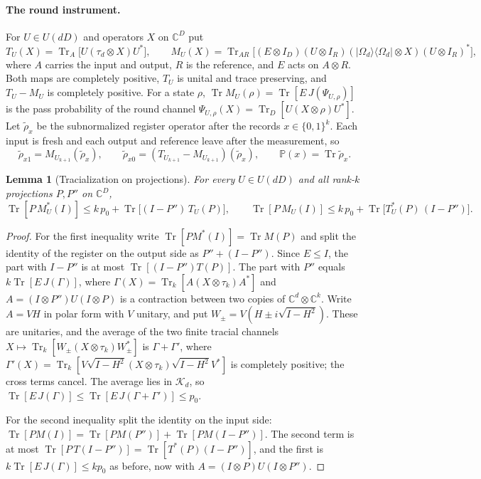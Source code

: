 \documentclass[11pt]{article}
\newtheorem{lemma}{Lemma}[section]
\theoremstyle{definition}
\theoremstyle{remark}
\DeclareMathOperator{\Tr}{Tr}
\newcommand{\K}{\mathcal K}
\newcommand{\C}{\mathbb C}
\newcommand{\Prob}{\mathbb P}
\newcommand{\ket}[1]{\lvert#1\rangle}
\newcommand{\bra}[1]{\langle#1\rvert}
\begin{document}
\paragraph{The round instrument.}
For $U\in U(dD)$ and operators $X$ on $\C^D$ put
\[
 T_U(X)=\Tr_A\bigl[U(\tau_d\otimes X)U^*\bigr],\qquad
 M_U(X)=\Tr_{AR}\bigl[(E\otimes I_D)(U\otimes I_R)(\ket{\Omega_d}\bra{\Omega_d}\otimes X)(U\otimes I_R)^*\bigr],
\]
where $A$ carries the input and output, $R$ is the reference, and $E$ acts on $A\otimes R$. Both maps are completely positive, $T_U$ is unital and trace preserving, and $T_U-M_U$ is completely positive. For a state $\rho$, $\Tr M_U(\rho)=\Tr[E\,J(\Psi_{U,\rho})]$ is the pass probability of the round channel $\Psi_{U,\rho}(X)=\Tr_D[U(X\otimes\rho)U^*]$. Let $\tilde\rho_x$ be the subnormalized register operator after the records $x\in\{0,1\}^k$. Each input is fresh and each output and reference leave after the measurement, so
\[
 \tilde\rho_{x1}=M_{U_{k+1}}(\tilde\rho_x),\qquad\tilde\rho_{x0}=(T_{U_{k+1}}-M_{U_{k+1}})(\tilde\rho_x),\qquad\Prob(x)=\Tr\tilde\rho_x.
\]

\begin{lemma}[Tracialization on projections]\label{lem:proj}
For every $U\in U(dD)$ and all rank-$k$ projections $P,P''$ on $\C^D$,
\[
 \Tr[P\,M_U^*(I)]\le k\,p_0+\Tr\bigl[(I-P'')\,T_U(P)\bigr],\qquad
 \Tr[P\,M_U(I)]\le k\,p_0+\Tr\bigl[T_U^*(P)\,(I-P'')\bigr].
\]
\end{lemma}

\begin{proof}
For the first inequality write $\Tr[PM^*(I)]=\Tr M(P)$ and split the identity of the register on the output side as $P''+(I-P'')$. Since $E\le I$, the part with $I-P''$ is at most $\Tr[(I-P'')T(P)]$. The part with $P''$ equals $k\Tr[E\,J(\Gamma)]$, where $\Gamma(X)=\Tr_k[A(X\otimes\tau_k)A^*]$ and $A=(I\otimes P'')U(I\otimes P)$ is a contraction between two copies of $\C^d\otimes\C^k$. Write $A=VH$ in polar form with $V$ unitary, and put $W_\pm=V(H\pm i\sqrt{I-H^2})$. These are unitaries, and the average of the two finite tracial channels $X\mapsto\Tr_k[W_\pm(X\otimes\tau_k)W_\pm^*]$ is $\Gamma+\Gamma'$, where $\Gamma'(X)=\Tr_k[V\sqrt{I-H^2}(X\otimes\tau_k)\sqrt{I-H^2}V^*]$ is completely positive; the cross terms cancel. The average lies in $\K_d$, so $\Tr[E\,J(\Gamma)]\le\Tr[E\,J(\Gamma+\Gamma')]\le p_0$.

For the second inequality split the identity on the input side: $\Tr[PM(I)]=\Tr[PM(P'')]+\Tr[PM(I-P'')]$. The second term is at most $\Tr[P\,T(I-P'')]=\Tr[T^*(P)(I-P'')]$, and the first is $k\Tr[E\,J(\Gamma)]\le kp_0$ as before, now with $A=(I\otimes P)U(I\otimes P'')$.
\end{proof}
\end{document}
